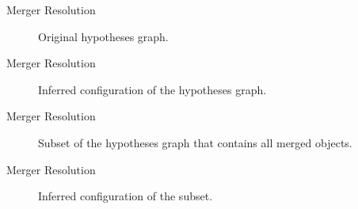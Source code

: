 \begin{frame}[plain]{Merger Resolution}
    \begin{figure}
        \centering
        \scalebox{0.7}{
            \begin{tikzpicture}[minimum size=58pt,scale=0.45, every node/.style={scale=0.45, font=\LARGE}, thick]
                
            \end{tikzpicture}
        }
        \caption{Original hypotheses graph.}
        \label{fig:conservation-hyp-inferred}
    \end{figure}
\end{frame}

\begin{frame}[plain]{Merger Resolution}
    \begin{figure}
        \centering
        \scalebox{0.7}{
            \begin{tikzpicture}[minimum size=58pt,scale=0.45, every node/.style={scale=0.45, font=\LARGE}, thick]
                
            \end{tikzpicture}
        }
        \caption{Inferred configuration of the hypotheses graph.}
        \label{fig:conservation-hyp-inferred}
    \end{figure}
\end{frame}

\begin{frame}[plain]{Merger Resolution}
    \begin{figure}
        \centering
        \scalebox{0.7}{
            \begin{tikzpicture}[minimum size=58pt,scale=0.45, every node/.style={scale=0.45, font=\LARGE}, thick]
                
            \end{tikzpicture}
        }
        \caption{Subset of the hypotheses graph that contains all merged objects.}
        \label{fig:conservation-hyp-inferred}
    \end{figure}
\end{frame}

\begin{frame}[plain]{Merger Resolution}
    \begin{figure}
        \centering
        \scalebox{0.7}{
            \begin{tikzpicture}[minimum size=58pt,scale=0.45, every node/.style={scale=0.45, font=\LARGE}, thick]
                
            \end{tikzpicture}
        }
        \caption{Inferred configuration of the subset.}
        \label{fig:conservation-hyp-inferred}
    \end{figure}
\end{frame}


